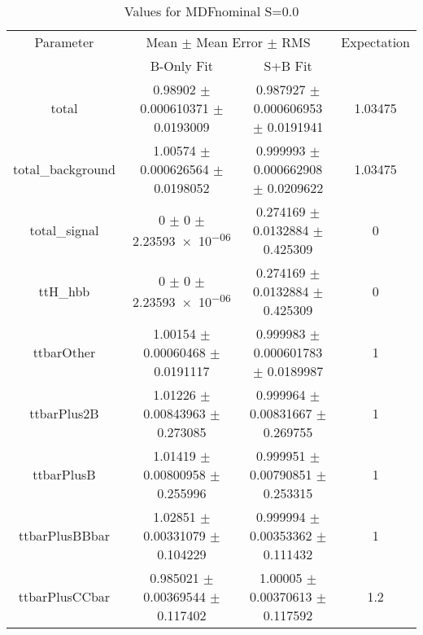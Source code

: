 \begin{table}
\centering
\caption{Values for MDFnominal S=0.0}
\begin{tabular}{cccc}
\toprule
Parameter & \multicolumn{2}{c}{Mean $\pm$ Mean Error $\pm$ RMS} & Expectation\\
 & B-Only Fit & S+B Fit & \\
\midrule
total & \num{0.98902} $\pm$ \num{0.000610371} $\pm$ \num{0.0193009} & \num{0.987927} $\pm$ \num{0.000606953} $\pm$ \num{0.0191941} & \num{1.03475}\\
total\_background & \num{1.00574} $\pm$ \num{0.000626564} $\pm$ \num{0.0198052} & \num{0.999993} $\pm$ \num{0.000662908} $\pm$ \num{0.0209622} & \num{1.03475}\\
total\_signal & \num{0} $\pm$ \num{0} $\pm$ \num{2.23593e-06} & \num{0.274169} $\pm$ \num{0.0132884} $\pm$ \num{0.425309} & \num{0}\\
ttH\_hbb & \num{0} $\pm$ \num{0} $\pm$ \num{2.23593e-06} & \num{0.274169} $\pm$ \num{0.0132884} $\pm$ \num{0.425309} & \num{0}\\
ttbarOther & \num{1.00154} $\pm$ \num{0.00060468} $\pm$ \num{0.0191117} & \num{0.999983} $\pm$ \num{0.000601783} $\pm$ \num{0.0189987} & \num{1}\\
ttbarPlus2B & \num{1.01226} $\pm$ \num{0.00843963} $\pm$ \num{0.273085} & \num{0.999964} $\pm$ \num{0.00831667} $\pm$ \num{0.269755} & \num{1}\\
ttbarPlusB & \num{1.01419} $\pm$ \num{0.00800958} $\pm$ \num{0.255996} & \num{0.999951} $\pm$ \num{0.00790851} $\pm$ \num{0.253315} & \num{1}\\
ttbarPlusBBbar & \num{1.02851} $\pm$ \num{0.00331079} $\pm$ \num{0.104229} & \num{0.999994} $\pm$ \num{0.00353362} $\pm$ \num{0.111432} & \num{1}\\
ttbarPlusCCbar & \num{0.985021} $\pm$ \num{0.00369544} $\pm$ \num{0.117402} & \num{1.00005} $\pm$ \num{0.00370613} $\pm$ \num{0.117592} & \num{1.2}\\
\bottomrule
\end{tabular}
\end{table}